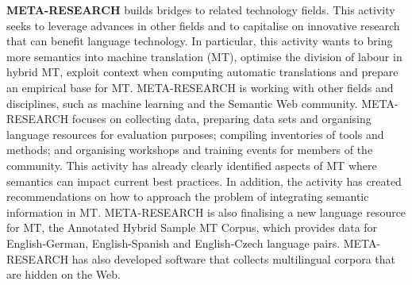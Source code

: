 {\bf META-RESEARCH} builds bridges to related technology fields. This activity
seeks to leverage advances in other fields and to capitalise on
innovative research that can benefit language technology. In particular,
this activity wants to bring more semantics into machine translation
(MT), optimise the division of labour in hybrid MT, exploit context when
computing automatic translations and prepare an empirical base for MT.
META-RESEARCH is working with other fields and disciplines, such as
machine learning and the Semantic Web community. META-RESEARCH focuses
on collecting data, preparing data sets and organising language
resources for evaluation purposes; compiling inventories of tools and
methods; and organising workshops and training events for members of the
community. This activity has already clearly identified aspects of MT
where semantics can impact current best practices. In addition, the
activity has created recommendations on how to approach the problem of
integrating semantic information in MT. META-RESEARCH is also finalising
a new language resource for MT, the Annotated Hybrid Sample MT Corpus,
which provides data for English-German, English-Spanish and
English-Czech language pairs. META-RESEARCH has also developed software
that collects multilingual corpora that are hidden on the Web.

